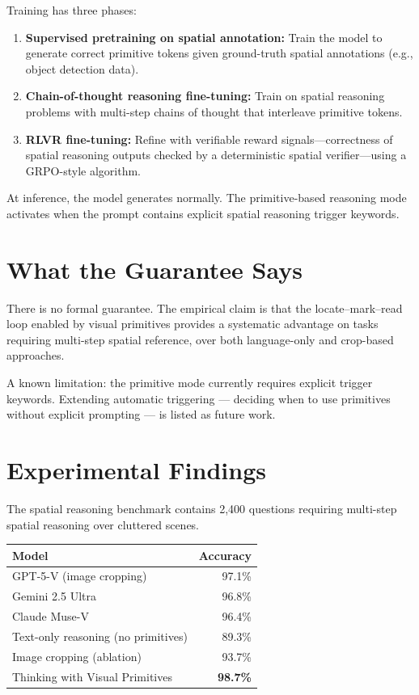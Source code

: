 \documentclass[10pt,twocolumn]{article}
\begin{document}
Training has three phases:

\begin{enumerate}[leftmargin=1.5em,itemsep=1pt]
  \item \textbf{Supervised pretraining on spatial annotation:} Train the model to generate correct primitive tokens given ground-truth spatial annotations (e.g., object detection data).
  \item \textbf{Chain-of-thought reasoning fine-tuning:} Train on spatial reasoning problems with multi-step chains of thought that interleave primitive tokens.
  \item \textbf{RLVR fine-tuning:} Refine with verifiable reward signals---correctness of spatial reasoning outputs checked by a deterministic spatial verifier---using a GRPO-style algorithm.
\end{enumerate}

At inference, the model generates normally.
The primitive-based reasoning mode activates when the prompt contains explicit spatial reasoning trigger keywords.

\section{What the Guarantee Says}

There is no formal guarantee.
The empirical claim is that the locate--mark--read loop enabled by visual primitives provides a systematic advantage on tasks requiring multi-step spatial reference, over both language-only and crop-based approaches.

A known limitation: the primitive mode currently requires explicit trigger keywords.
Extending automatic triggering --- deciding when to use primitives without explicit prompting --- is listed as future work.

\section{Experimental Findings}

The spatial reasoning benchmark contains 2,400 questions requiring multi-step spatial reasoning over cluttered scenes.

\begin{center}
\small
\begin{tabular}{lr}
\toprule
\textbf{Model} & \textbf{Accuracy} \\
\midrule
GPT-5-V (image cropping) & 97.1\% \\
Gemini 2.5 Ultra & 96.8\% \\
Claude Muse-V & 96.4\% \\
Text-only reasoning (no primitives) & 89.3\% \\
Image cropping (ablation) & 93.7\% \\
Thinking with Visual Primitives & \textbf{98.7\%} \\
\bottomrule
\end{tabular}
\end{center}
\end{document}
